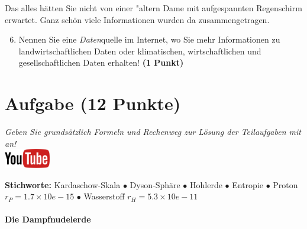 \documentclass[a4paper, 9pt]{scrartcl}\usepackage[]{graphicx}\usepackage[]{xcolor}
\begin{document}
Das alles hätten Sie nicht von einer {"a}ltern Dame mit aufgespannten Regenschirm erwartet. Ganz schön viele Informationen wurden da zusammengetragen.

\begin{enumerate}
  \setcounter{enumi}{5}  
  \item Nennen Sie eine \textit{Daten}quelle im Internet, wo Sie mehr Informationen zu landwirtschaftlichen Daten oder klimatischen, wirtschaftlichen und gesellschaftlichen Daten erhalten! \textbf{(1 Punkt)}
\end{enumerate} 
\clearpage

\section{Aufgabe \hfill (12 Punkte)}

\textit{Geben Sie grunds{\"a}tzlich Formeln und Rechenweg zur L{\"o}sung der
  Teilaufgaben mit an!} \\[1Ex]

\hfill\href{https://youtu.be/WZSxntiNF8s}{\includegraphics[width = 2cm]{img/youtube}} %
\hspace{2Ex}

{\tiny\textbf{Stichworte:} Kardaschow-Skala $\bullet$ Dyson-Sphäre $\bullet$ Hohlerde $\bullet$ Entropie $\bullet$ Proton $r_P = 1.7 \times 10e-15$ $\bullet$ Wasserstoff $r_H = 5.3\times 10e-11$}

\paragraph{Die Dampfnudelerde}
\end{document}
